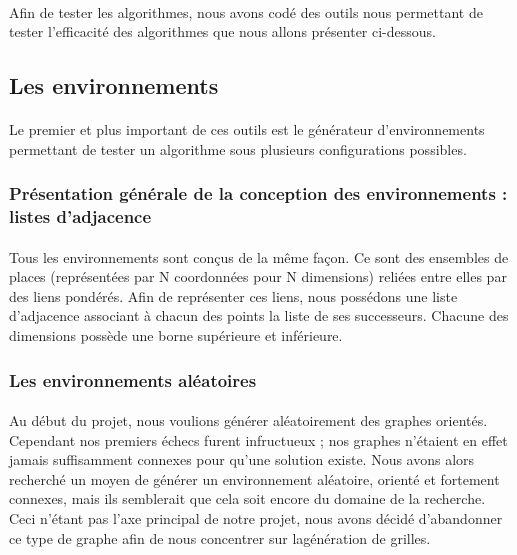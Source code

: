 \documentclass[pidr]{tnreport}
\begin{document}
\paragraph{}
Afin de tester les algorithmes, nous avons codé des outils nous permettant de tester l'efficacité des algorithmes que nous allons présenter ci-dessous.

		\subsection{Les environnements}

\paragraph{}
Le premier et plus important de ces outils est le générateur d'environnements permettant de tester un algorithme sous plusieurs configurations possibles.

			\subsubsection{Présentation générale de la conception des environnements : listes d'adjacence}
			
\paragraph{}
Tous les environnements sont conçus de la même façon. Ce sont des ensembles de places (représentées par N coordonnées pour N dimensions) reliées entre elles par des liens pondérés. Afin de représenter ces liens, nous possédons une liste d'adjacence associant à chacun des points la liste de ses successeurs. Chacune des dimensions possède une borne supérieure et inférieure.
	
			\subsubsection{Les environnements aléatoires}

\paragraph{}
Au début du projet, nous voulions générer aléatoirement des graphes orientés. Cependant nos premiers échecs furent infructueux ; nos graphes n'étaient en effet jamais suffisamment connexes pour qu'une solution existe. Nous avons alors recherché un moyen de générer un environnement aléatoire, orienté et fortement connexes, mais ils semblerait que cela soit encore du domaine de la recherche. Ceci n'étant pas l'axe principal de notre projet, nous avons décidé d'abandonner ce type de graphe afin de nous concentrer sur lagénération de grilles.
			
\end{document}
